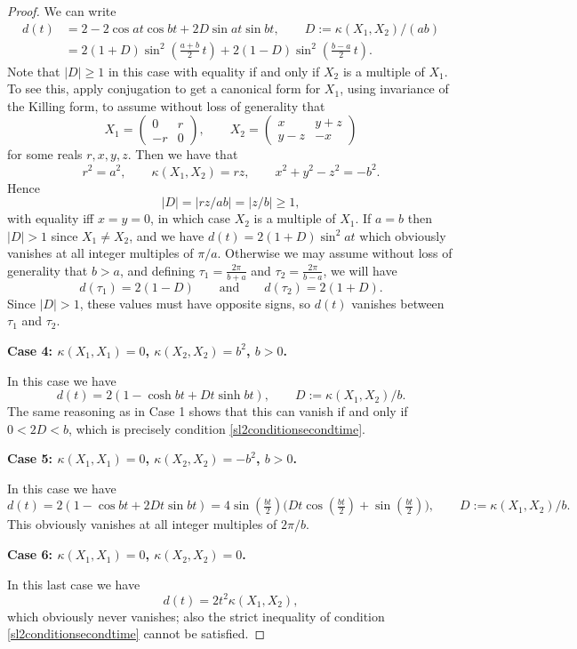 \documentclass[10pt,a4paper]{amsart}
\newcommand{\bim}{\kappa}
\newcommand{\mattyone}{X_1}
\newcommand{\mattytwo}{X_2}
\newcommand{\simpkill}{\kappa}
\begin{document}
\begin{proof}
    We can write
    \begin{align*}
        d(t) &= 2-2\cos{a t}\cos{bt} +2 D \sin{at}\sin{bt}, \qquad D:=\simpkill(\mattyone,\mattytwo)/(ab) \\
        &= 
        2(1+D) \sin^2{\left( \frac{a+ b}{2} \, t\right)} + 2(1-D)\sin^2{\left( \frac{ b -a}{2} \, t\right)}.
    \end{align*}
    Note that $\lvert D\rvert\ge 1$ in this case with equality if and only if $\mattytwo$ is a multiple of $\mattyone$. To see this, apply conjugation to get a canonical form for $\mattyone$, using invariance of the Killing form, to assume without loss of generality that
    $$ \mattyone = \left( \begin{matrix} 0 & r \\ 
    -r & 0 \end{matrix}\right), \qquad \mattytwo = \left(\begin{matrix} x & y+z \\ y-z & -x\end{matrix}\right)$$
    for some reals $r,x,y,z$. 
    Then we have that 
    $$ r^2=a^2, \qquad \simpkill(\mattyone,\mattytwo) = rz, \qquad 
    x^2+y^2-z^2= -b^2.$$
    Hence $$\lvert D\rvert = \lvert rz/ab\rvert = \lvert z/b\rvert \ge 1,$$
    with equality iff $x=y=0$, in which case $\mattytwo$ is a multiple of $\mattyone$.
If $a=b$ then $\lvert D\rvert > 1$ since $\mattyone\ne \mattytwo$, and we have $d(t) = 2(1+D) \sin^2{at}$ which obviously vanishes at all integer multiples of $\pi/a$. 
Otherwise we may assume without loss of generality that $b>a$, and  defining $\tau_1 = \frac{2\pi}{b+a}$ and $\tau_2 = \frac{2\pi}{b-a}$, we will have 
    $$d(\tau_1) = 2(1-D)  \qquad \text{and}\qquad d(\tau_2) = 2(1+D).$$
    Since $\lvert D\rvert > 1$, these values must have opposite signs,
    so $d(t)$ vanishes between $\tau_1$ and $\tau_2$. 
 

\textbf{Case 4: $\simpkill(\mattyone,\mattyone)=0$, $\simpkill(\mattytwo,\mattytwo)=b^2$, $b>0$.}

In this case we have 
$$ d(t) = 2(1-\cosh{bt} + Dt \sinh{bt}), \qquad D:= \bim(\mattyone,\mattytwo)/b.$$
The same reasoning as in Case 1 shows that this can vanish if and only if $0<2D<b$, which is precisely condition \eqref{sl2conditionsecondtime}.

\textbf{Case 5: $\simpkill(\mattyone,\mattyone)=0$, $\simpkill(\mattytwo,\mattytwo)=-b^2$, $b>0$.}

In this case we have 
$$d(t) = 2(1-\cos{bt} + 2Dt\sin{bt}) = 4\sin{(\tfrac{bt}{2})} \big( Dt \cos{(\tfrac{bt}{2})} + \sin{(\tfrac{bt}{2})}\big), \qquad D:= \bim(\mattyone,\mattytwo)/b.$$
This obviously vanishes at all integer multiples of $2\pi/b$. 

\textbf{Case 6: $\simpkill(\mattyone,\mattyone)=0$, $\simpkill(\mattytwo,\mattytwo)=0$.}

In this last case we have 
$$d(t) = 2t^2 \bim(\mattyone,\mattytwo),$$
which obviously never vanishes; also the strict inequality of condition \eqref{sl2conditionsecondtime} cannot be satisfied.
\end{proof}
\end{document}
